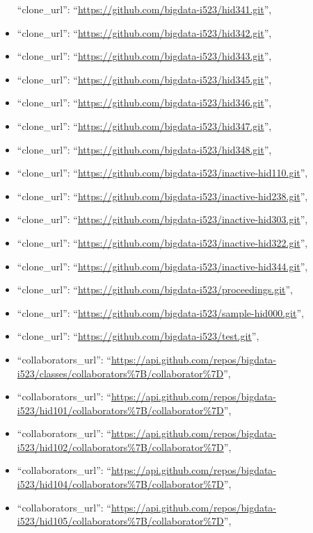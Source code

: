 \begin{itemize}
  ``clone\_url'': ``\url{https://github.com/bigdata-i523/hid341.git}'',
\item
  ``clone\_url'': ``\url{https://github.com/bigdata-i523/hid342.git}'',
\item
  ``clone\_url'': ``\url{https://github.com/bigdata-i523/hid343.git}'',
\item
  ``clone\_url'': ``\url{https://github.com/bigdata-i523/hid345.git}'',
\item
  ``clone\_url'': ``\url{https://github.com/bigdata-i523/hid346.git}'',
\item
  ``clone\_url'': ``\url{https://github.com/bigdata-i523/hid347.git}'',
\item
  ``clone\_url'': ``\url{https://github.com/bigdata-i523/hid348.git}'',
\item
  ``clone\_url'':
  ``\url{https://github.com/bigdata-i523/inactive-hid110.git}'',
\item
  ``clone\_url'':
  ``\url{https://github.com/bigdata-i523/inactive-hid238.git}'',
\item
  ``clone\_url'':
  ``\url{https://github.com/bigdata-i523/inactive-hid303.git}'',
\item
  ``clone\_url'':
  ``\url{https://github.com/bigdata-i523/inactive-hid322.git}'',
\item
  ``clone\_url'':
  ``\url{https://github.com/bigdata-i523/inactive-hid344.git}'',
\item
  ``clone\_url'':
  ``\url{https://github.com/bigdata-i523/proceedings.git}'',
\item
  ``clone\_url'':
  ``\url{https://github.com/bigdata-i523/sample-hid000.git}'',
\item
  ``clone\_url'': ``\url{https://github.com/bigdata-i523/test.git}'',
\item
  ``collaborators\_url'':
  ``\url{https://api.github.com/repos/bigdata-i523/classes/collaborators\%7B/collaborator\%7D}'',
\item
  ``collaborators\_url'':
  ``\url{https://api.github.com/repos/bigdata-i523/hid101/collaborators\%7B/collaborator\%7D}'',
\item
  ``collaborators\_url'':
  ``\url{https://api.github.com/repos/bigdata-i523/hid102/collaborators\%7B/collaborator\%7D}'',
\item
  ``collaborators\_url'':
  ``\url{https://api.github.com/repos/bigdata-i523/hid104/collaborators\%7B/collaborator\%7D}'',
\item
  ``collaborators\_url'':
  ``\url{https://api.github.com/repos/bigdata-i523/hid105/collaborators\%7B/collaborator\%7D}'',

\end{itemize}
